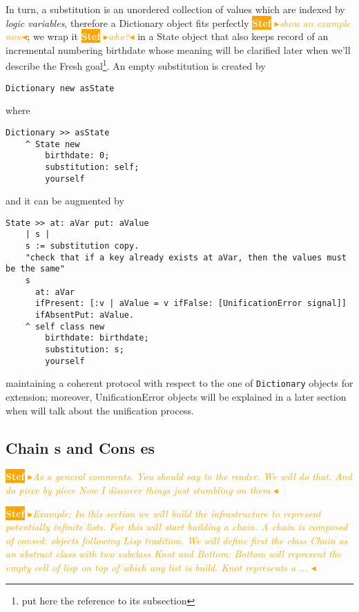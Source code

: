 \documentclass[a4paper,11pt]{article}
\newcommand{\nb}[3]{
		{\colorbox{#2}{\bfseries\sffamily\scriptsize\textcolor{white}{#1}}}
		{\textcolor{#2}{\sf\small$\blacktriangleright$\textit{#3}$\blacktriangleleft$}}}
\newcommand{\nb}[3]{}
\newcommand{\sd}[1]{\nb{Stef}{orange}{#1}}
\newcommand{\ct}[1]{{\textsf{#1}}\xspace}
\begin{document}
 In turn, a substitution is an unordered collection of
values which are indexed by \textit{logic variables}, therefore a
\ct{Dictionary} object fits perfectly \sd{show an example now}; we wrap it \sd{who?} in a \ct{State} object
that also keeps record of an incremental numbering  \ct{birthdate} whose
meaning will be clarified later when we'll describe the  \ct{Fresh}
goal\footnote{put here the reference to its subsection}. An empty substitution
is created by
\begin{verbatim}
Dictionary new asState
\end{verbatim}
where
\begin{verbatim}
Dictionary >> asState
    ^ State new
        birthdate: 0;
        substitution: self;
        yourself
\end{verbatim}
and it can be augmented by
\begin{verbatim}
State >> at: aVar put: aValue
    | s |
    s := substitution copy.
    "check that if a key already exists at aVar, then the values must be the same"
    s 
      at: aVar
      ifPresent: [:v | aValue = v ifFalse: [UnificationError signal]]
      ifAbsentPut: aValue.
    ^ self class new
        birthdate: birthdate;
        substitution: s;
        yourself
\end{verbatim}
maintaining a coherent protocol with respect to the one of \Verb|Dictionary|
objects for extension; moreover, \ct{UnificationError} objects will be
explained in a later section when will talk about the unification process.

\subsection{\ct{Chain}s and \ct{Cons}es}
\sd{As a general comments. You should say to the reader. We will do that. And do piece by piece
Now I discover things just stumbling on them.}

\sd{Example: In this section we will build the infrastructure to represent potentially infinite lists. 
For this will start building a chain. A chain is composed of consed: objects following Lisp tradition. 
We will define first the class Chain as an abstract class with two subclass \ct{Knot} and \ct{Bottom}.
\ct{Bottom} will represent the empty cell of lisp on top of which any list is build. \ct{Knot} represents 
a ...
}
\end{document}
